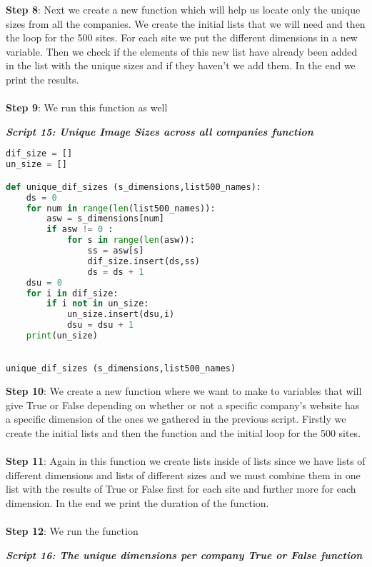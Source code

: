 \documentclass{article}
\begin{document}
\textbf{Step 8}: Next we create a new function which will help us locate only the unique sizes from all the companies. We create the initial lists that we will need and then the loop for the 500 sites. For each site we put the different dimensions in a new variable. Then we check if the elements of this new list have already been added in the list with the unique sizes and if they haven't we add them. In the end we print the results.\\\\
\textbf{Step 9}: We run this function as well
\begin{center}
\textit{\textbf{Script 15: Unique Image Sizes across all companies function}}
\end{center}
\begin{lstlisting}[language=Python]
dif_size = []  
un_size = [] 

def unique_dif_sizes (s_dimensions,list500_names):
    ds = 0
    for num in range(len(list500_names)):
        asw = s_dimensions[num]
        if asw != 0 :
            for s in range(len(asw)):
                ss = asw[s]
                dif_size.insert(ds,ss)
                ds = ds + 1    
    dsu = 0
    for i in dif_size:
        if i not in un_size:
            un_size.insert(dsu,i)
            dsu = dsu + 1
    print(un_size)          
 

unique_dif_sizes (s_dimensions,list500_names)
\end{lstlisting}
\textbf{Step 10}: We create a new function where we want to make to variables that will give True or False depending on whether or not a specific company's website has a specific dimension of the ones we gathered in the previous script. Firstly we create the initial lists and then the function and the initial loop for the 500 sites.\\\\
\textbf{Step 11}: Again in this function we create lists inside of lists since we have lists of different dimensions and lists of different sizes and we must combine them in one list with the results of True or False first for each site and further more for each dimension. In the end we print the duration of the function.\\\\
\textbf{Step 12}: We run the function
\begin{center}
\textit{\textbf{Script 16: The unique dimensions per company True or False function}}
\end{center}
\end{document}
